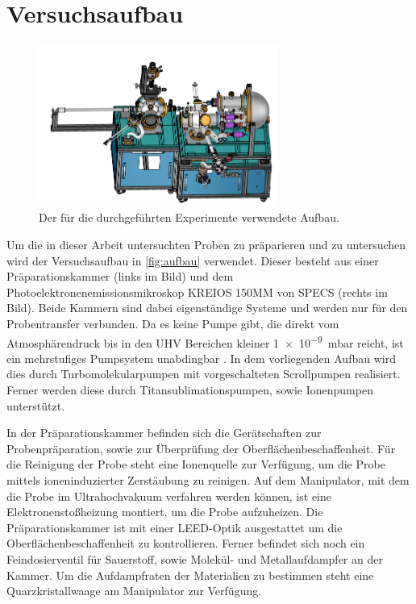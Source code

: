     \section{Versuchsaufbau} \label{sec:Versuchsaufbau}
        \begin{figure}
            \centering
            \includegraphics[width=0.7\textwidth]{MM.png}
            \caption{Der für die durchgeführten Experimente verwendete Aufbau.}
            \label{fig:aufbau}
        \end{figure}
        Um die in dieser Arbeit untersuchten Proben zu präparieren und zu untersuchen wird der Versuchsaufbau in \autoref{fig:aufbau} verwendet.
        Dieser besteht aus einer Präparationskammer (links im Bild) und dem Photoelektronenemissionsmikroskop KREIOS 150MM von SPECS (rechts im Bild).
        Beide Kammern sind dabei eigenständige Systeme und werden nur für den Probentransfer verbunden.
        Da es keine Pumpe gibt, die direkt vom Atmosphärendruck bis in den UHV Bereichen kleiner \SI{1e-9}{\milli\bar} reicht, ist ein mehrstufiges Pumpsystem unabdingbar \cite{Henzler}.
        In dem vorliegenden Aufbau wird dies durch Turbomolekularpumpen mit vorgeschalteten Scrollpumpen realisiert.
        Ferner werden diese durch Titansublimationspumpen, sowie Ionenpumpen unterstützt.

        In der Präparationskammer befinden sich die Gerätschaften zur Probenpräparation, sowie zur Überprüfung der Oberflächenbeschaffenheit.
        Für die Reinigung der Probe steht eine Ionenquelle zur Verfügung, um die Probe mittels ioneninduzierter Zerstäubung zu reinigen.
        Auf dem Manipulator, mit dem die Probe im Ultrahochvakuum verfahren werden können, ist eine Elektronenstoßheizung montiert, um die Probe aufzuheizen.
        Die Präparationskammer ist mit einer LEED-Optik ausgestattet um die Oberflächenbeschaffenheit zu kontrollieren.
        Ferner befindet sich noch ein Feindosierventil für Sauerstoff, sowie Molekül- und Metallaufdampfer an der Kammer.
        Um die Aufdampfraten der Materialien zu bestimmen steht eine Quarzkristallwaage am Manipulator zur Verfügung.

